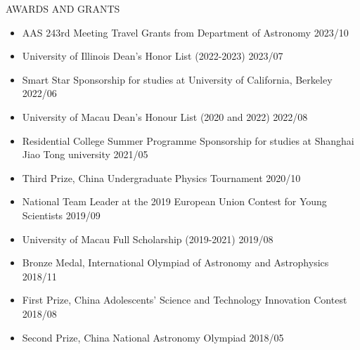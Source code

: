 \documentclass[11pt]{article} %
\begin{document}
\begin{section}{AWARDS AND GRANTS}

    \begin{itemize}[leftmargin=1.5em]
        \item AAS 243rd Meeting Travel Grants from Department of Astronomy \hfill 2023/10
        \item University of Illinois Dean's Honor List (2022-2023) \hfill 2023/07
        \item Smart Star Sponsorship for studies at University of California, Berkeley \hfill 2022/06
        \item University of Macau Dean's Honour List (2020 and 2022) \hfill 2022/08
        \item Residential College Summer Programme Sponsorship for studies at Shanghai Jiao Tong university \hfill 2021/05
        \item Third Prize, China Undergraduate Physics Tournament \hfill 2020/10
        \item National Team Leader at the 2019 European Union Contest for Young Scientists \hfill 2019/09
        \item University of Macau Full Scholarship (2019-2021) \hfill 2019/08
        \item Bronze Medal, International Olympiad of Astronomy and Astrophysics \hfill 2018/11
        \item First Prize, China Adolescents' Science and Technology Innovation Contest \hfill 2018/08
        \item Second Prize, China National Astronomy Olympiad \hfill 2018/05
    \end{itemize}
        
\end{section}
\end{document}
